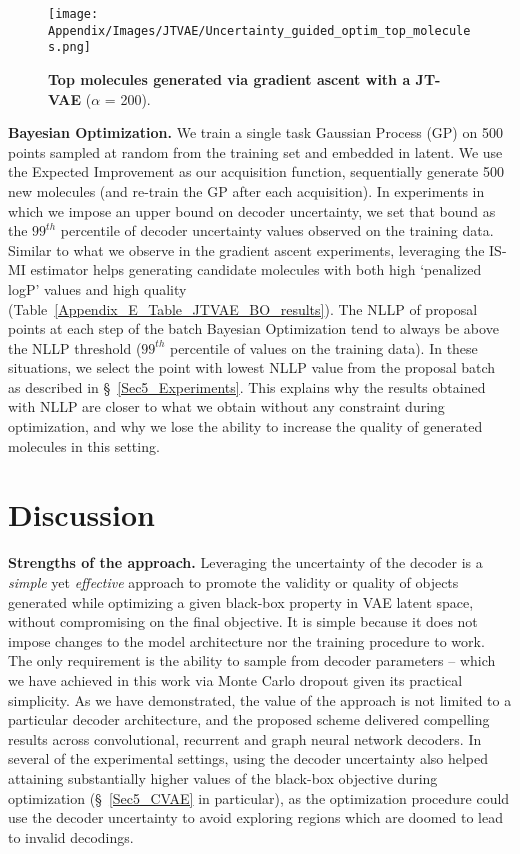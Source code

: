 \begin{figure*}[h]
    \centering
    \texttt{[image: Appendix/Images/JTVAE/Uncertainty\_guided\_optim\_top\_molecules.png]}
    \caption{\textbf{Top molecules generated via gradient ascent with a JT-VAE} ($\alpha$ = 200).}
    \label{Fig_Appendix_JTVAE_GA_Top_molecules_generated}
\end{figure*}

\textbf{Bayesian Optimization.} We train a single task Gaussian Process (GP) on 500 points sampled at random from the training set and embedded in latent. We use the Expected Improvement as our acquisition function, sequentially generate 500 new molecules (and re-train the GP after each acquisition). In experiments in which we impose an upper bound on decoder uncertainty, we set that bound as the $99^{th}$ percentile of decoder uncertainty values observed on the training data. Similar to what we observe in the gradient ascent experiments, leveraging the IS-MI estimator helps generating candidate molecules with both high `penalized logP' values and high quality (Table~\ref{Appendix_E_Table_JTVAE_BO_results}). The NLLP of proposal points at each step of the batch Bayesian Optimization tend to always be above the NLLP threshold ($99^{th}$ percentile of values on the training data). In these situations, we select the point with lowest NLLP value from the proposal batch as described in \S~\ref{Sec5_Experiments}. This explains why the results obtained with NLLP are closer to what we obtain without any constraint during optimization, and why we lose the ability to increase the quality of generated molecules in this setting.



\vspace{-2mm}
\section{Discussion}

\vspace{-1mm}
\textbf{Strengths of the approach. } Leveraging the uncertainty of the decoder is a \emph{simple} yet \emph{effective} approach to promote the validity or quality of objects generated while optimizing a given black-box property in VAE latent space, without compromising on the final objective. It is simple because it does not impose changes to the model architecture nor the training procedure to work. The only requirement is the ability to sample from decoder parameters -- which we have achieved in this work via Monte Carlo dropout given its practical simplicity.
As we have demonstrated, the value of the approach is not limited to a particular decoder architecture, and the proposed scheme delivered compelling results across convolutional, recurrent and graph neural network decoders.
In several of the experimental settings, using the decoder uncertainty also helped attaining substantially higher values of the black-box objective during optimization (\S~\ref{Sec5_CVAE} in particular), as the optimization procedure could use the decoder uncertainty to avoid exploring regions which are doomed to lead to invalid decodings.

